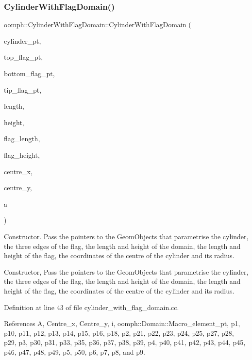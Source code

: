 \subsubsection{\texorpdfstring{Cylinder\+With\+Flag\+Domain()}{CylinderWithFlagDomain()}}
{\footnotesize\ttfamily oomph\+::\+Cylinder\+With\+Flag\+Domain\+::\+Cylinder\+With\+Flag\+Domain (\begin{DoxyParamCaption}\item[{\hyperlink{classoomph_1_1Circle}{Circle} $\ast$}]{cylinder\+\_\+pt,  }\item[{\hyperlink{classoomph_1_1GeomObject}{Geom\+Object} $\ast$}]{top\+\_\+flag\+\_\+pt,  }\item[{\hyperlink{classoomph_1_1GeomObject}{Geom\+Object} $\ast$}]{bottom\+\_\+flag\+\_\+pt,  }\item[{\hyperlink{classoomph_1_1GeomObject}{Geom\+Object} $\ast$}]{tip\+\_\+flag\+\_\+pt,  }\item[{const double \&}]{length,  }\item[{const double \&}]{height,  }\item[{const double \&}]{flag\+\_\+length,  }\item[{const double \&}]{flag\+\_\+height,  }\item[{const double \&}]{centre\+\_\+x,  }\item[{const double \&}]{centre\+\_\+y,  }\item[{const double \&}]{a }\end{DoxyParamCaption})}

Constructor. Pass the pointers to the Geom\+Objects that parametrise the cylinder, the three edges of the flag, the length and height of the domain, the length and height of the flag, the coordinates of the centre of the cylinder and its radius.

Constructor, Pass the pointers to the Geom\+Objects that parametrise the cylinder, the three edges of the flag, the length and height of the domain, the length and height of the flag, the coordinates of the centre of the cylinder and its radius. 

Definition at line 43 of file cylinder\+\_\+with\+\_\+flag\+\_\+domain.\+cc.



References A, Centre\+\_\+x, Centre\+\_\+y, i, oomph\+::\+Domain\+::\+Macro\+\_\+element\+\_\+pt, p1, p10, p11, p12, p13, p14, p15, p16, p18, p2, p21, p22, p23, p24, p25, p27, p28, p29, p3, p30, p31, p33, p35, p36, p37, p38, p39, p4, p40, p41, p42, p43, p44, p45, p46, p47, p48, p49, p5, p50, p6, p7, p8, and p9.

